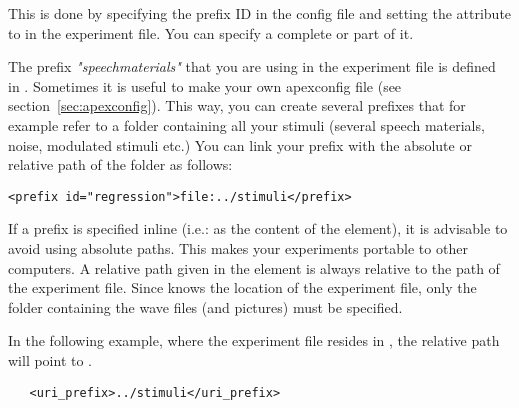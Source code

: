 This is done by specifying the prefix ID in the \apex config file and setting the attribute  to  in the experiment file. You can specify a
complete  or part of it.

The prefix \emph{"speechmaterials"} that you are using in the experiment file is defined in . Sometimes it is useful to make your own apexconfig file (see section~\ref{sec:apexconfig}). This way, you can create several prefixes that for example refer to a folder containing all your stimuli (several speech materials, noise, modulated stimuli etc.) You can link your prefix with the absolute or relative path of the folder as follows: \\

\begin{lstlisting}
<prefix id="regression">file:../stimuli</prefix>
\end{lstlisting}


If a prefix is specified inline (i.e.: as the content of the  element), it is advisable to avoid using absolute paths.
This makes your experiments portable to other computers.
A relative path given in the  element is
always relative to the path of the experiment file. Since \apex
knows the location of the experiment file, only the folder
containing the wave files (and pictures) must be specified.

In the following example, where the experiment file resides in , the relative path will point to .

\begin{lstlisting}
   <uri_prefix>../stimuli</uri_prefix>
\end{lstlisting}






\label{sec:prefixes}


